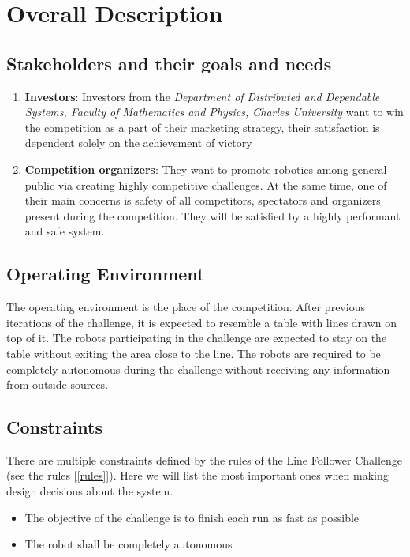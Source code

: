 \chapter{Overall Description}
\label{Overall Description}

\section{Stakeholders and their goals and needs}

\begin{enumerate}
    \item \label{d3s} \textbf{Investors}: Investors from the \textit{Department of Distributed and Dependable Systems, Faculty of Mathematics and Physics, Charles University} want to win the competition as a part of their marketing strategy, their satisfaction is dependent solely on the achievement of victory
    \item \label{organizers} \textbf{Competition organizers}: They want to promote robotics among general public via creating highly competitive challenges. At the same time, one of their main concerns is safety of all competitors, spectators and organizers present during the competition. They will be satisfied by a highly performant and safe system.
\end{enumerate}

\section{Operating Environment}

The operating environment is the place of the competition. After previous iterations of the challenge, it is expected to resemble a table with lines drawn on top of it. The robots participating in the challenge are expected to stay on the table without exiting the area close to the line. The robots are required to be completely autonomous during the challenge without receiving any information from outside sources.

\section{Constraints}

There are multiple constraints defined by the rules of the Line Follower Challenge (see the rules [\ref{rules}]). Here we will list the most important ones when making design decisions about the system.

\begin{itemize}
    \item The objective of the challenge is to finish each run as fast as possible
    \item The robot shall be completely autonomous
\end{itemize}

